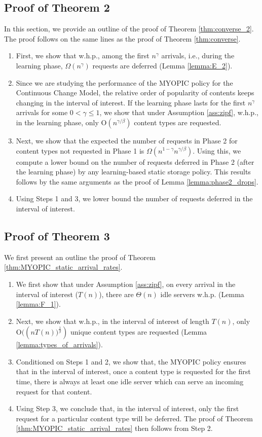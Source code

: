 \documentclass[10pt, conference, letterpaper]{IEEEtran}
\def \OO {\mathrm{O}}
\begin{document}
\subsection{Proof of Theorem 2}
In this section, we provide an outline of the proof of Theorem \ref{thm:converse_2}. The proof follows on the same lines as the proof of Theorem \ref{thm:converse}.
\begin{enumerate}
	\item First, we show that w.h.p., among the first $n^{\gamma}$ arrivals, i.e., during the learning phase, $\Omega(n^{\gamma})$ requests are deferred (Lemma \ref{lemma:E_2}).
	\item Since we are studying the performance of the MYOPIC policy for the Continuous Change Model, the relative order of popularity of contents keeps changing in the interval of interest. If the learning phase lasts for the first $n^{\gamma}$ arrivals for some $0<\gamma \leq 1$, we show that under Assumption \ref{ass:zipf}, w.h.p., in the learning phase, only $\OO(n^{\gamma/\beta})$ content types are requested.
	\item Next, we show that the expected the number of requests in Phase 2 for content types not requested in Phase 1 is $\Omega(n^{1-\gamma}n^{\gamma/\beta})$. Using this, we compute a lower bound on the number of requests deferred in Phase 2 (after the learning phase) by any learning-based static storage policy. This results follows by the same arguments as the proof of Lemma \ref{lemma:phase2_drops}.
	\item Using Steps 1 and 3, we lower bound the number of requests deferred in the interval of interest.
\end{enumerate}


\subsection{Proof of Theorem 3}
\label{sec:proof3}

\noindent We first present an outline the proof of Theorem \ref{thm:MYOPIC_static_arrival_rates}.

\begin{enumerate}
	\item We first show that under Assumption \ref{ass:zipf}, on every arrival in the interval of interest ($T(n)$), there are $\Theta(n)$ idle servers w.h.p. (Lemma \ref{lemma:F_1}).
	\item Next, we show that w.h.p., in the interval of interest of length $T(n)$, only $\OO\big((nT(n)\big)^{\frac{1}{\beta}})$ unique content types are requested (Lemma \ref{lemma:types_of_arrivals}).
	\item Conditioned on Steps 1 and 2, we show that, the MYOPIC policy ensures that in the interval of interest, once a content type is requested for the first time, there is always at least one idle server which can serve an incoming request for that content.
	\item Using Step 3, we conclude that, in the interval of interest, only the first request for a particular content type will be deferred. The proof of Theorem \ref{thm:MYOPIC_static_arrival_rates} then follows from Step 2.
\end{enumerate}
\end{document}
